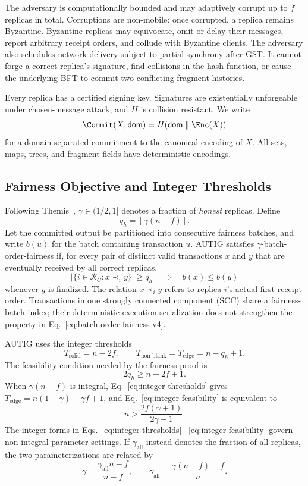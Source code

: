 The adversary is computationally bounded and may adaptively corrupt up to $f$
replicas in total.  Corruptions are non-mobile: once corrupted, a replica
remains Byzantine.  Byzantine replicas may equivocate, omit or delay their messages,
report arbitrary receipt orders, and collude with Byzantine clients.  The
adversary also schedules network delivery subject to partial synchrony after
GST.  It cannot forge a correct replica's signature, find collisions in the
hash function, or cause the underlying BFT to commit two conflicting fragment
histories.

Every replica has a certified signing key.  Signatures are existentially
unforgeable under chosen-message attack, and $H$ is collision resistant.  We
write
\[
 \Commit(X;\mathsf{dom})
   =H(\mathsf{dom}\parallel\Enc(X))
\]
for a domain-separated commitment to the canonical encoding of $X$.  All
sets, maps, trees, and fragment fields have deterministic encodings.

\subsection{Fairness Objective and Integer Thresholds}
\label{sec:fairness-objective-v4}

Following Themis~\cite{kelkar2023themis}, $\gamma\in(1/2,1]$
denotes a fraction of \emph{honest} replicas.  Define
\[
 q_h=\left\lceil\gamma(n-f)\right\rceil.
\]
Let the committed output be partitioned into consecutive fairness batches, and
write $b(u)$ for the batch containing transaction $u$.  AUTIG satisfies
$\gamma$-batch-order-fairness if, for every pair of distinct valid transactions
$x$ and $y$ that are eventually received by all correct replicas,
\[
 \left|\{i\in\mathcal R_C:x\prec_i y\}\right|\ge q_h
 \quad\Longrightarrow\quad b(x)\le b(y)
 \tag{1}\label{eq:batch-order-fairness-v4}
\]
whenever $y$ is finalized.  The relation $x\prec_i y$ refers to replica $i$'s
actual first-receipt order.  Transactions in one strongly connected component
(SCC) share a fairness-batch index; their deterministic execution
serialization does not strengthen the property in
Eq.~\eqref{eq:batch-order-fairness-v4}.

AUTIG uses the integer thresholds
\[
 T_{\mathrm{solid}}=n-2f,
 \qquad
 T_{\mathrm{non\mbox{-}blank}}=T_{\mathrm{edge}}
   =n-q_h+1.
 \tag{2}\label{eq:integer-thresholds}
\]
The feasibility condition needed by the fairness proof is
\[
 2q_h\ge n+2f+1.
 \tag{3}\label{eq:integer-feasibility}
\]
When $\gamma(n-f)$ is integral, Eq.~\eqref{eq:integer-thresholds}
gives $T_{\mathrm{edge}}=n(1-\gamma)+\gamma f+1$, and
Eq.~\eqref{eq:integer-feasibility} is equivalent to
\[
 n>\frac{2f(\gamma+1)}{2\gamma-1}.
\]
The integer forms in Eqs.~\eqref{eq:integer-thresholds}--
\eqref{eq:integer-feasibility} govern non-integral parameter settings.  If
$\gamma_{\mathrm{all}}$ instead denotes the fraction of all replicas, the two
parameterizations are related by
\[
 \gamma=\frac{\gamma_{\mathrm{all}}n-f}{n-f},
 \qquad
 \gamma_{\mathrm{all}}=\frac{\gamma(n-f)+f}{n}.
 \tag{4}\label{eq:gamma-reparameterization}
\]


